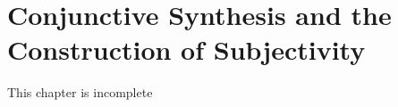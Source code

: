 \chapter{Conjunctive Synthesis and the Construction of
  Subjectivity}\label{conjunctive}
\begin{orangebox}
	This chapter is incomplete
\end{orangebox}


